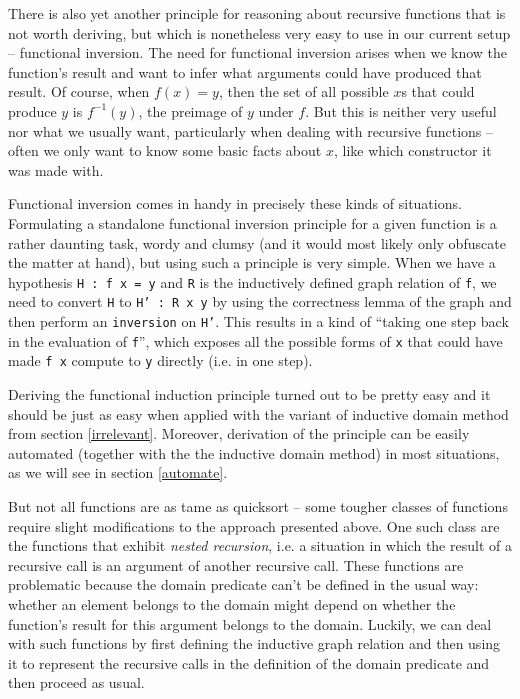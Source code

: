 \documentclass[declaration,mgr,english,shortabstract]{iithesis}
\newcommand{\m}[1]{\texttt{#1}}
\begin{document}
There is also yet another principle for reasoning about recursive functions that is not worth deriving, but which is nonetheless very easy to use in our current setup -- functional inversion. The need for functional inversion arises when we know the function's result and want to infer what arguments could have produced that result. Of course, when $f(x) = y$, then the set of all possible $x$s that could produce $y$ is $f^{-1}(y)$, the preimage of $y$ under $f$. But this is neither very useful nor what we usually want, particularly when dealing with recursive functions -- often we only want to know some basic facts about $x$, like which constructor it was made with.

Functional inversion comes in handy in precisely these kinds of situations. Formulating a standalone functional inversion principle for a given function is a rather daunting task, wordy and clumsy (and it would most likely only obfuscate the matter at hand), but using such a principle is very simple. When we have a hypothesis \m{H : f x = y} and \m{R} is the inductively defined graph relation of \m{f}, we need to convert \m{H} to \m{H' : R x y} by using the correctness lemma of the graph and then perform an \m{inversion} on \m{H'}. This results in a kind of ``taking one step back in the evaluation of \m{f}'', which exposes all the possible forms of \m{x} that could have made \m{f x} compute to \m{y} directly (i.e. in one step).

Deriving the functional induction principle turned out to be pretty easy and it should be just as easy when applied with the variant of inductive domain method from section \ref{irrelevant}. Moreover, derivation of the principle can be easily automated (together with the the inductive domain method) in most situations, as we will see in section \ref{automate}.

But not all functions are as tame as quicksort -- some tougher classes of functions require slight modifications to the approach presented above. One such class are the functions that exhibit \textit{nested recursion}, i.e. a situation in which the result of a recursive call is an argument of another recursive call. These functions are problematic because the domain predicate can't be defined in the usual way: whether an element belongs to the domain might depend on whether the function's result for this argument belongs to the domain. Luckily, we can deal with such functions by first defining the inductive graph relation and then using it to represent the recursive calls in the definition of the domain predicate and then proceed as usual.
\end{document}
